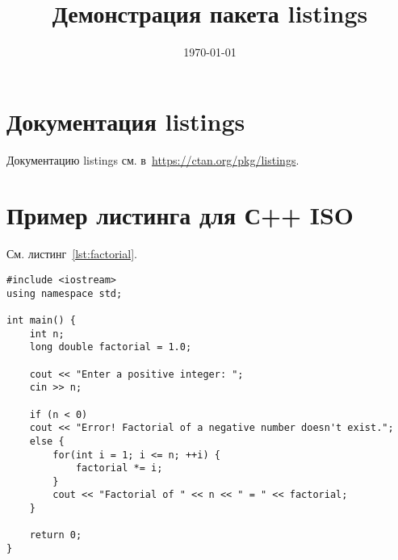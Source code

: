 \documentclass{../SIBGU-state}
\title{Демонстрация пакета listings}
\date{\today}
\begin{document}
	
\maketitle
\addtocounter{page}{1}
	
\tableofcontents
	
\section{Документация listings}

Документацию listings см. в~\url{https://ctan.org/pkg/listings}.


\section{Пример листинга для С++ ISO}

См. листинг~\ref{lst:factorial}.

\begin{lstlisting}[language={[ISO]{C++}}, caption={Нахождение факториала}, label=lst:factorial]
#include <iostream>
using namespace std;

int main() {
	int n;
	long double factorial = 1.0;
	
	cout << "Enter a positive integer: ";
	cin >> n;
	
	if (n < 0)
	cout << "Error! Factorial of a negative number doesn't exist.";
	else {
		for(int i = 1; i <= n; ++i) {
			factorial *= i;
		}
		cout << "Factorial of " << n << " = " << factorial;    
	}
	
	return 0;
}
\end{lstlisting}
\end{document}
